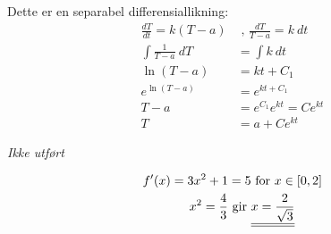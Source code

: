 \documentclass[a4paper,norsk,12pt]{article}
\begin{document}
Dette er en separabel differensiallikning:
\begin{align*}
  \frac{dT}{dt}  = k(T-a) & \text{ , }
  \frac{dT}{T-a}  = k~dt \\
  \int{\frac{1}{T-a}~dT} & = \int{ k~dt } \\
  \ln{(T-a)} & = kt + C_1 \\
  e^{\ln{(T-a)}} & = e^{kt + C_1} \\
  T-a & = e^{C_1} e^{kt} = Ce^{kt} \\
  T & = a + Ce^{kt}
\end{align*}

\textit{Ikke utført}


\begin{align*}
  f'(x) = 3x^2 + 1 & = 5 \text{ for } x \in [0,2]\\
  x^2 = \frac{4}{3} & \text{ gir }
  \svar{x = \frac{2}{\sqrt{3}}}
\end{align*}
\end{document}

